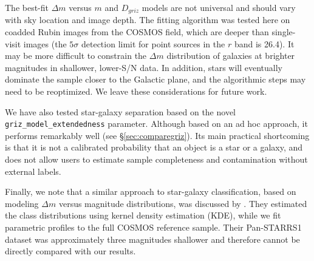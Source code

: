 The best-fit $\Delta m$ versus $m$ and $D_{griz}$ models are not universal and should vary with sky
location and image depth. The fitting algorithm was tested here on coadded Rubin images from the
COSMOS field, which are deeper than single-visit images (the $5\sigma$ detection limit for point
sources in the $r$ band is 26.4). It may be more difficult to constrain the $\Delta m$ distribution
of galaxies at brighter magnitudes in shallower, lower-S/N data. In addition, stars will eventually
dominate the sample closer to the Galactic plane, and the algorithmic steps may need to be
reoptimized. We leave these considerations for future work.


We have also tested star-galaxy separation based on the novel \texttt{griz\_model\_extendedness}
parameter. Although based on an ad hoc approach, it performs remarkably well (see \S\ref{sec:comparegriz}).
Its main practical shortcoming is that it is not a calibrated probability that an object is a star or a
galaxy, and does not allow users to estimate sample completeness and contamination without
external labels.


Finally, we note that a similar approach to star-galaxy classification, based on modeling $\Delta m$
versus magnitude distributions, was discussed by \cite{2021PASP..133e4502M}. They estimated the class distributions using
kernel density estimation (KDE), while we fit parametric profiles to the full COSMOS reference sample. Their Pan-STARRS1 dataset was approximately three magnitudes
shallower and therefore cannot be directly compared with our results.


